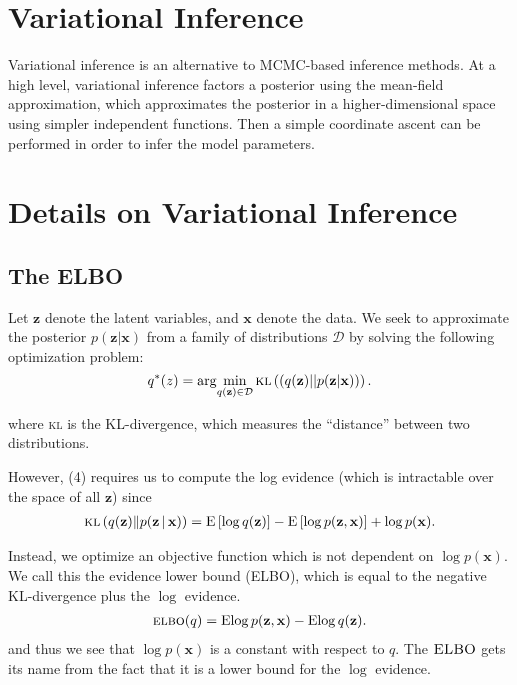 \documentclass[11pt]{article}
\newcommand{\bx}{\ensuremath{\mathbf{x}}}
\newcommand{\bz}{\ensuremath{\mathbf{z}}}
\newcommand{\kl}[1]{\textsc{kl}\left(#1\right)}
\newcommand{\g}{\,\vert\,}
\newcommand{\ELBO}{\textsc{elbo}}
\newcommand{\E}{\mathrm{E}}
\begin{document}
\section{Variational Inference}

Variational inference is an alternative to MCMC-based inference methods. At a high level, variational inference factors a posterior using the mean-field approximation, which approximates the posterior in a higher-dimensional space using simpler independent functions. Then a simple coordinate ascent can be performed in order to infer the model parameters.

\section{Details on Variational Inference}

\subsection{The \textsc{ELBO}}

Let $\mathbf{z}$ denote the latent variables, and $\mathbf{x}$ denote the data. We seek to approximate the posterior $p(\mathbf{z}|\mathbf{x})$ from a family of distributions $\mathcal{D}$ by solving the following optimization problem: 
\begin{equation}
q^*(z) = \arg\!\min_{q(\mathbf{z}) \in \mathcal{D}} \kl{(q(\mathbf{z}) || p(\mathbf{z}|\mathbf{x}))}.
\end{equation}

where \textsc{kl} is the KL-divergence, which measures the ``distance'' between two distributions. 

However, (4) requires us to compute the log evidence (which is intractable over the space of all $\mathbf{z}$) since 
\begin{align}
  \kl{q(\bz) \| p(\bz \g \bx)} =
  \E\left[\log q(\bz)\right] -
  \E\left[\log p(\bz, \bx)\right] +
  \log p(\bx). 
\end{align}

Instead, we optimize an objective function which is not dependent on $\log p(\bx)$. We call this the evidence lower bound (\textsc{ELBO}), which is equal to the negative \textsc{KL}-divergence plus the $\log$ evidence.
\begin{align}
  \ELBO(q) =
  \E{\log p(\bz, \bx)} -
  \E{\log q(\bz)}.
\end{align}
and thus we see that $\log p(\bx)$ is a constant with respect to $q$. The $\textsc{ELBO}$ gets its name from the fact that it is a lower bound for the $\log$ evidence. 
\end{document}
